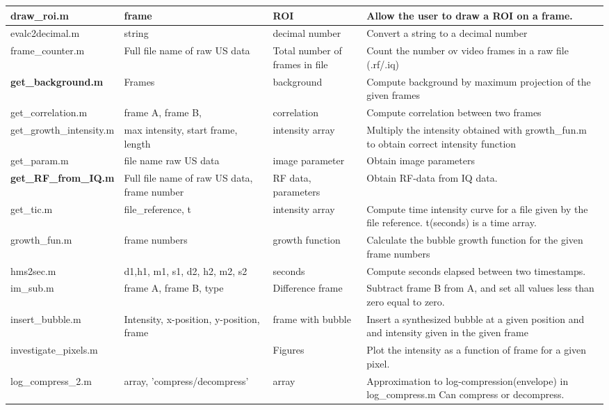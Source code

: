 \begin{center}
\begin{longtable}{@{} p{3cm} p{3cm} p{2cm} p{4cm} @{}}
			draw\_roi.m & frame & ROI & Allow the user to draw a ROI on a frame. \\ \hline 
			evalc2decimal.m & string & decimal number & Convert a string to a decimal number \\ \hline 
			frame\_counter.m & Full file name of raw US data & Total number of frames in file & Count the number ov video frames in a raw file (.rf/.iq) \\ \hline 
			\textbf{get\_background.m} & Frames & background & Compute background by maximum projection of the given frames \\ \hline 
			get\_correlation.m & frame A, frame B, & correlation & Compute correlation between two frames \\ \hline 
			get\_growth\_intensity.m & max intensity, start frame, length & intensity array & Multiply the intensity obtained with growth\_fun.m to obtain correct intensity function \\ \hline 
			get\_param.m & file name raw US data & image parameter & Obtain image parameters \\ \hline 
			\textbf{get\_RF\_from\_IQ.m} & Full file name of raw US data, frame number & RF data, parameters & Obtain RF-data from IQ data.  \\ \hline 
			get\_tic.m & file\_reference, t & intensity array & Compute time intensity curve for a file given by the file reference.  t(seconds) is a time array.  \\ \hline 
			growth\_fun.m & frame numbers & growth function & Calculate the bubble growth function for the given frame numbers \\ \hline 
			hms2sec.m & d1,h1, m1, s1, d2, h2, m2, s2 & seconds & Compute seconds elapsed between two timestamps.  \\ \hline 
			im\_sub.m & frame A, frame B, type & Difference frame & Subtract frame B from A, and set all values less than zero equal to zero. \\ \hline 
			insert\_bubble.m & Intensity, x-position, y-position, frame & frame with bubble & Insert a synthesized bubble at a given position and and intensity given in the given frame \\ \hline 
			investigate\_pixels.m &  & Figures & Plot the intensity as a function of frame for a given pixel. \\ \hline 
			log\_compress\_2.m & array, 'compress/decompress' & array & Approximation to log-compression(envelope) in log\_compress.m Can compress or decompress. \\ \hline 

\end{longtable}
\end{center}
